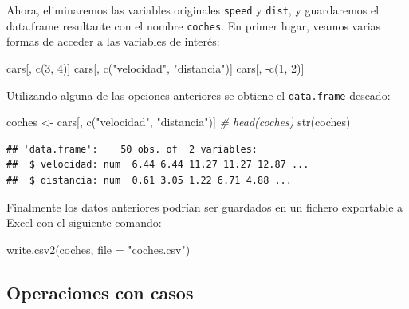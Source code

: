 \documentclass[
]{book}
\newenvironment{Shaded}{\begin{snugshade}}{\end{snugshade}}
\newcommand{\AttributeTok}[1]{\textcolor[rgb]{0.77,0.63,0.00}{#1}}
\newcommand{\CommentTok}[1]{\textcolor[rgb]{0.56,0.35,0.01}{\textit{#1}}}
\newcommand{\DecValTok}[1]{\textcolor[rgb]{0.00,0.00,0.81}{#1}}
\newcommand{\FunctionTok}[1]{\textcolor[rgb]{0.00,0.00,0.00}{#1}}
\newcommand{\NormalTok}[1]{#1}
\newcommand{\OtherTok}[1]{\textcolor[rgb]{0.56,0.35,0.01}{#1}}
\newcommand{\SpecialCharTok}[1]{\textcolor[rgb]{0.00,0.00,0.00}{#1}}
\newcommand{\StringTok}[1]{\textcolor[rgb]{0.31,0.60,0.02}{#1}}
\theoremstyle{break}
\theoremstyle{nonumberplain}
\begin{document}
Ahora, eliminaremos las variables originales \texttt{speed} y
\texttt{dist}, y guardaremos el data.frame resultante con el nombre \texttt{coches}.
En primer lugar, veamos varias formas de acceder a las variables de
interés:

\begin{Shaded}
\begin{Highlighting}[]
\NormalTok{cars[, }\FunctionTok{c}\NormalTok{(}\DecValTok{3}\NormalTok{, }\DecValTok{4}\NormalTok{)]}
\NormalTok{cars[, }\FunctionTok{c}\NormalTok{(}\StringTok{"velocidad"}\NormalTok{, }\StringTok{"distancia"}\NormalTok{)]}
\NormalTok{cars[, }\SpecialCharTok{{-}}\FunctionTok{c}\NormalTok{(}\DecValTok{1}\NormalTok{, }\DecValTok{2}\NormalTok{)]}
\end{Highlighting}
\end{Shaded}

Utilizando alguna de las opciones anteriores se obtiene el \texttt{data.frame}
deseado:

\begin{Shaded}
\begin{Highlighting}[]
\NormalTok{coches }\OtherTok{\textless{}{-}}\NormalTok{ cars[, }\FunctionTok{c}\NormalTok{(}\StringTok{"velocidad"}\NormalTok{, }\StringTok{"distancia"}\NormalTok{)]}
\CommentTok{\# head(coches)}
\FunctionTok{str}\NormalTok{(coches)}
\end{Highlighting}
\end{Shaded}

\begin{verbatim}
## 'data.frame':    50 obs. of  2 variables:
##  $ velocidad: num  6.44 6.44 11.27 11.27 12.87 ...
##  $ distancia: num  0.61 3.05 1.22 6.71 4.88 ...
\end{verbatim}

Finalmente los datos anteriores podrían ser guardados en un fichero
exportable a Excel con el siguiente comando:

\begin{Shaded}
\begin{Highlighting}[]
\FunctionTok{write.csv2}\NormalTok{(coches, }\AttributeTok{file =} \StringTok{"coches.csv"}\NormalTok{)}
\end{Highlighting}
\end{Shaded}

\hypertarget{operaciones-con-casos}{%
\subsection{Operaciones con casos}\label{operaciones-con-casos}}
\end{document}
